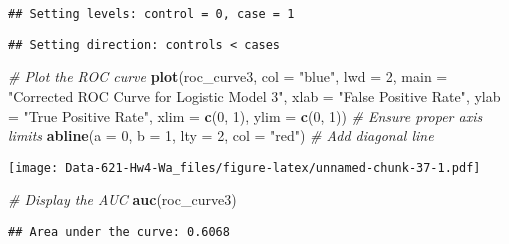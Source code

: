 \documentclass[
]{article}
\newenvironment{Shaded}{\begin{snugshade}}{\end{snugshade}}
\newcommand{\AttributeTok}[1]{\textcolor[rgb]{0.13,0.29,0.53}{#1}}
\newcommand{\CommentTok}[1]{\textcolor[rgb]{0.56,0.35,0.01}{\textit{#1}}}
\newcommand{\DecValTok}[1]{\textcolor[rgb]{0.00,0.00,0.81}{#1}}
\newcommand{\FloatTok}[1]{\textcolor[rgb]{0.00,0.00,0.81}{#1}}
\newcommand{\FunctionTok}[1]{\textcolor[rgb]{0.13,0.29,0.53}{\textbf{#1}}}
\newcommand{\NormalTok}[1]{#1}
\newcommand{\OtherTok}[1]{\textcolor[rgb]{0.56,0.35,0.01}{#1}}
\newcommand{\SpecialCharTok}[1]{\textcolor[rgb]{0.81,0.36,0.00}{\textbf{#1}}}
\newcommand{\StringTok}[1]{\textcolor[rgb]{0.31,0.60,0.02}{#1}}
\begin{document}
\begin{Shaded}
\end{Shaded}

\begin{verbatim}
## Setting levels: control = 0, case = 1
\end{verbatim}

\begin{verbatim}
## Setting direction: controls < cases
\end{verbatim}

\begin{Shaded}
\begin{Highlighting}[]
\CommentTok{\# Plot the ROC curve}
\FunctionTok{plot}\NormalTok{(roc\_curve3, }\AttributeTok{col =} \StringTok{"blue"}\NormalTok{, }\AttributeTok{lwd =} \DecValTok{2}\NormalTok{, }
     \AttributeTok{main =} \StringTok{"Corrected ROC Curve for Logistic Model 3"}\NormalTok{,}
     \AttributeTok{xlab =} \StringTok{"False Positive Rate"}\NormalTok{, }\AttributeTok{ylab =} \StringTok{"True Positive Rate"}\NormalTok{, }
     \AttributeTok{xlim =} \FunctionTok{c}\NormalTok{(}\DecValTok{0}\NormalTok{, }\DecValTok{1}\NormalTok{), }\AttributeTok{ylim =} \FunctionTok{c}\NormalTok{(}\DecValTok{0}\NormalTok{, }\DecValTok{1}\NormalTok{))  }\CommentTok{\# Ensure proper axis limits}
\FunctionTok{abline}\NormalTok{(}\AttributeTok{a =} \DecValTok{0}\NormalTok{, }\AttributeTok{b =} \DecValTok{1}\NormalTok{, }\AttributeTok{lty =} \DecValTok{2}\NormalTok{, }\AttributeTok{col =} \StringTok{"red"}\NormalTok{)  }\CommentTok{\# Add diagonal line}
\end{Highlighting}
\end{Shaded}

\texttt{[image: Data-621-Hw4-Wa\_files/figure-latex/unnamed-chunk-37-1.pdf]}

\begin{Shaded}
\begin{Highlighting}[]
\CommentTok{\# Display the AUC}
\FunctionTok{auc}\NormalTok{(roc\_curve3)}
\end{Highlighting}
\end{Shaded}

\begin{verbatim}
## Area under the curve: 0.6068
\end{verbatim}
\end{document}
